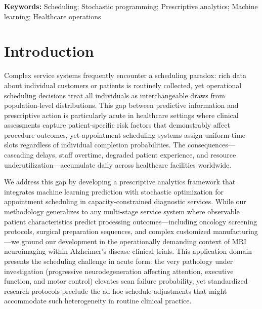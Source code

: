 \documentclass[11pt,a4paper]{article}
\begin{document}
\noindent\textbf{Keywords:} Scheduling; Stochastic programming; Prescriptive analytics; Machine learning; Healthcare operations




\section{Introduction}


Complex service systems frequently encounter a scheduling paradox: rich data about individual customers or patients is routinely collected, yet operational scheduling decisions treat all individuals as interchangeable draws from population-level distributions. This gap between predictive information and prescriptive action is particularly acute in healthcare settings where clinical assessments capture patient-specific risk factors that demonstrably affect procedure outcomes, yet appointment scheduling systems assign uniform time slots regardless of individual completion probabilities. The consequences---cascading delays, staff overtime, degraded patient experience, and resource underutilization---accumulate daily across healthcare facilities worldwide.

We address this gap by developing a prescriptive analytics framework that integrates machine learning prediction with stochastic optimization for appointment scheduling in capacity-constrained diagnostic services. While our methodology generalizes to any multi-stage service system where observable patient characteristics predict processing outcomes---including oncology screening protocols, surgical preparation sequences, and complex customized manufacturing---we ground our development in the operationally demanding context of MRI neuroimaging within Alzheimer's disease clinical trials. This application domain presents the scheduling challenge in acute form: the very pathology under investigation (progressive neurodegeneration affecting attention, executive function, and motor control) elevates scan failure probability, yet standardized research protocols preclude the ad hoc schedule adjustments that might accommodate such heterogeneity in routine clinical practice.
\end{document}
